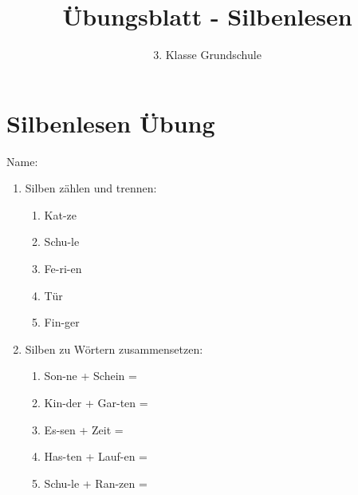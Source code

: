 \documentclass[a4paper]{article}
\begin{document}
\title{Übungsblatt - Silbenlesen}
\author{3. Klasse Grundschule}
\date{}

\maketitle

\section*{Silbenlesen Übung}

Name: \underline{\hspace{6cm}}

\vspace{0.5cm}

\begin{enumerate}[label=\arabic*.]
    \item Silben zählen und trennen:
    
    \begin{enumerate}[label=\alph*)]
        \item Kat-ze
        \item Schu-le
        \item Fe-ri-en
        \item Tür
        \item Fin-ger
    \end{enumerate}
    
    \vspace{1cm}
    
    \item Silben zu Wörtern zusammensetzen:
    
    \begin{enumerate}[label=\alph*)]
        \item Son-ne + Schein = \underline{\hspace{4cm}}
        \item Kin-der + Gar-ten = \underline{\hspace{4cm}}
        \item Es-sen + Zeit = \underline{\hspace{4cm}}
        \item Has-ten + Lauf-en = \underline{\hspace{4cm}}
        \item Schu-le + Ran-zen = \underline{\hspace{4cm}}
    \end{enumerate}
    
    \vspace{1cm}
    

\end{enumerate}
\end{document}
